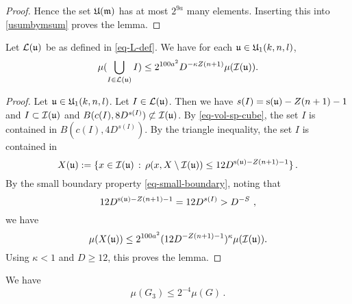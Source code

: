 {\begin{proof}
Hence the set ${\mathfrak U}(\mathfrak{m})$ has at most
$2^{9a}$ many elements.
Inserting this into \eqref{usumbymsum} proves the lemma.
\end{proof}

\begin{lemma}
\label{boundary-exception}

Let $\mathcal{L}({\mathfrak u})$ be as defined in \eqref{eq-L-def}. We have for each ${\mathfrak u}\in {\mathfrak U}_1(k,n,l)$,
\begin{equation}
\mu(\bigcup_{I\in \mathcal{L}({\mathfrak u})} I)
\le 2^{100a^2} D^{-\kappa Z(n+1)}
        \mu({\mathcal{I}}(\mathfrak{u})).
\end{equation}

\end{lemma}


\begin{proof}
  Let ${\mathfrak u}\in {\mathfrak U}_1(k,n,l)$.
Let $I \in \mathcal{L}({\mathfrak u})$. Then we have $s(I) = {\mathrm{s}}({\mathfrak u}) - Z(n+1) - 1$ and $I \subset {\mathcal{I}}({\mathfrak u})$ and $B(c(I), 8D^{s(I)}) \not \subset {\mathcal{I}}({\mathfrak u})$.
By \eqref{eq-vol-sp-cube}, the set $I$
is contained in $B(c(I), 4D^{s(I)})$.
By the triangle inequality, the set $I$
is contained in
\begin{equation}
    X({\mathfrak u}):=\{x \in {\mathcal{I}}({\mathfrak u}) \, : \, \rho(x, X \setminus {\mathcal{I}}({\mathfrak u})) \leq 12 D^{{\mathrm{s}}({\mathfrak u}) - Z(n+1)-1}\}\,.
\end{equation}
 By the small boundary property \eqref{eq-small-boundary}, noting that
 \begin{equation*}
     12D^{{\mathrm{s}}({\mathfrak u}) - Z(n+1) - 1} = 12D^{s(I)} > D^{-S}\ ,
 \end{equation*} we have
   $$
        \mu(X({\mathfrak u})) \le
        2^{100a^2}(12 D^{-Z(n+1)-1})^\kappa
        \mu({\mathcal{I}}(\mathfrak{u})).
    $$
Using $\kappa<1$ and $D \ge 12$, this proves the lemma.
\end{proof}














    \begin{lemma}
    \label{third-exception}
       We have
\begin{equation}
    \mu(G_3)\le 2^{-4} \mu(G)\, .
\end{equation}
    \end{lemma}



}
